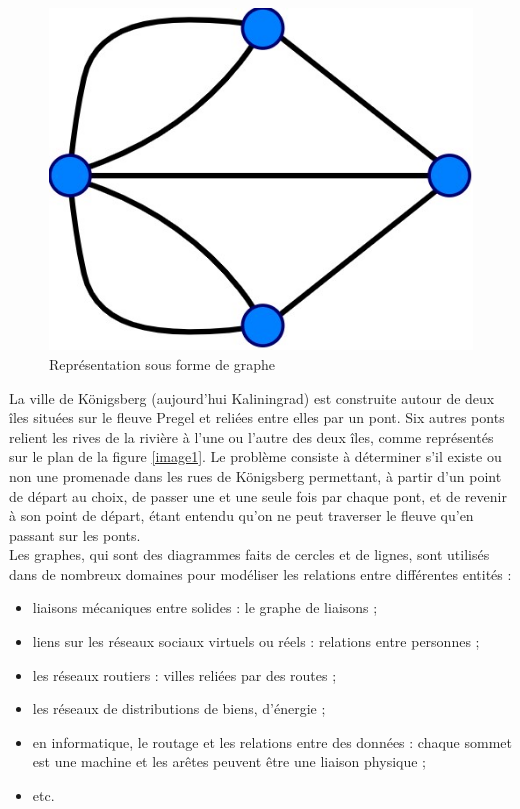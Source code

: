\begin{figure}[h]
\begin{minipage}[c]{.32\linewidth}
        \includegraphics[height=0.7\textwidth]{images/ponts_graphe.jpg}
        \caption{Représentation sous forme de graphe}
    \end{minipage}
\end{figure}

La ville de Königsberg (aujourd'hui Kaliningrad) est construite autour de deux îles situées sur le fleuve Pregel et reliées entre elles par un pont. Six autres ponts relient les rives de la rivière à l'une ou l'autre des deux îles, comme représentés sur le plan de la figure \ref{image1}. Le problème consiste à déterminer s'il existe ou non une promenade dans les rues de Königsberg permettant, à partir d'un point de départ au choix, de passer une et une seule fois par chaque pont, et de revenir à son point de départ, étant entendu qu'on ne peut traverser le fleuve qu'en passant sur les ponts.\\

Les graphes, qui sont des diagrammes faits de cercles et de lignes, sont utilisés dans de nombreux domaines pour modéliser les relations entre différentes entités :
\begin{itemize}
\item liaisons mécaniques entre solides : le graphe de liaisons ;
\item liens sur les réseaux sociaux virtuels ou réels : relations entre personnes ;
\item les réseaux routiers : villes reliées par des routes ;
\item les réseaux de distributions de biens, d'énergie ;
\item en informatique, le routage et les relations entre des données : chaque sommet est une machine et les arêtes peuvent être une liaison physique ;
\item etc.
\end{itemize}
  

